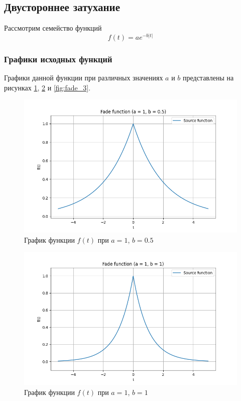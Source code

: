 \subsection{Двустороннее затухание}

Рассмотрим семейство функций 
\begin{equation}
    f(t) = ae^{-b|t|}
    \label{eq:fade_function}
\end{equation}

\subsubsection{Графики исходных функций}

Графики данной функции при различных значениях $a$ и $b$ представлены на рисунках \ref{fig:fade_1}, \ref{fig:fade_2} и \ref{fig:fade_3}.
\begin{figure}[ht!]
    \centering
    \includegraphics[width=\textwidth]{media/fade_1.png}
    \caption{График функции $f(t)$ при $a = 1$, $b = 0.5$}
    \label{fig:fade_1}
\end{figure}

\begin{figure}[ht!]
    \centering
    \includegraphics[width=\textwidth]{media/fade_2.png}
    \caption{График функции $f(t)$ при $a = 1$, $b = 1$}
    \label{fig:fade_2}
\end{figure}

